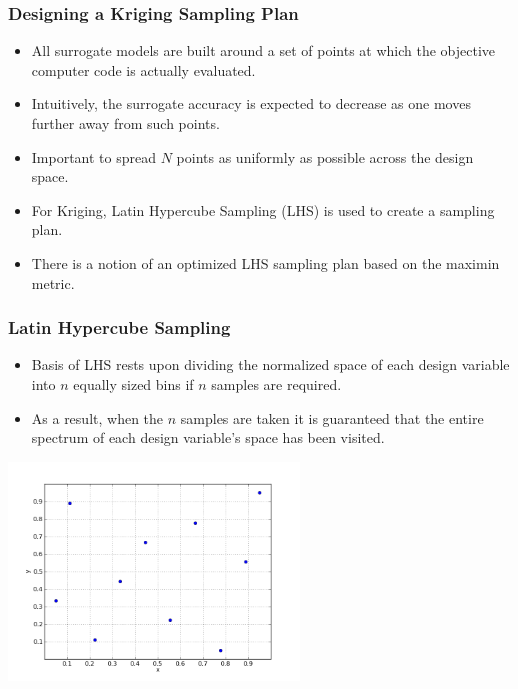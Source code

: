 \documentclass{beamer}
\begin{document}
\begin{frame}
\frametitle{Designing a Kriging Sampling Plan}

\begin{itemize}
  \item All surrogate models are built around a set of points at which the objective computer code is actually evaluated. 
  \item Intuitively, the surrogate accuracy is expected to decrease as one moves further away from such points. 
  \item Important to spread $N$ points as uniformly as possible across the design space.
  \item For Kriging, Latin Hypercube Sampling (LHS) is used to create a sampling plan.
  \item There is a notion of an optimized LHS sampling plan based on the maximin metric.   
\end{itemize}

\end{frame}
\begin{frame}
\frametitle{Latin Hypercube Sampling}

\begin{itemize}
  \item Basis of LHS rests upon dividing the normalized space of each design variable into $n$ equally sized bins if $n$ samples are required. 
  \item As a result, when the $n$ samples are taken it is guaranteed that the entire
spectrum of each design variable's space has been visited.  
\end{itemize}
\centering
\includegraphics[width=0.58\textwidth]{./lhs.png}

\end{frame}
\end{document}
